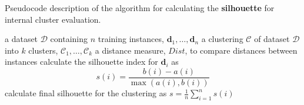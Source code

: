 \documentclass[xcolor={table}]{beamer}
\newcommand{\keyword}[1]{{\textbf{#1}}\index{#1}}
\begin{document}
\begin{frame}[plain]
\scriptsize{Pseudocode description of the algorithm for calculating the \keyword{silhouette} for internal cluster evaluation.}
\begin{footnotesize}
\begin{algorithmic}[1]
\Require a dataset $\mathcal{D}$ containing $n$ training instances, $\mathbf{d}_1, \ldots, \mathbf{d}_n$ 
\Require a clustering $\mathbf{\mathcal{C}}$ of dataset $\mathcal{D}$ into $k$ clusters, $\mathcal{C}_{1}, \ldots, \mathcal{C}_{k}$ 
\Require a distance measure, ${Dist}$, to compare distances between instances
    \State  calculate the silhouette index for $\mathbf{d}_i$ as
    \begin{equation}
    s(i)= \frac{b(i)-a(i)}{\max(a(i), b(i))}
    \label{eqn:silhouette_width}
    \end{equation}
\EndFor
\State calculate final silhouette for the clustering as  $ \displaystyle s = \frac{1}{n}\sum_{i=1}^n{s(i)}$ 
\end{algorithmic}
\end{footnotesize}
\end{frame}
\end{document}
